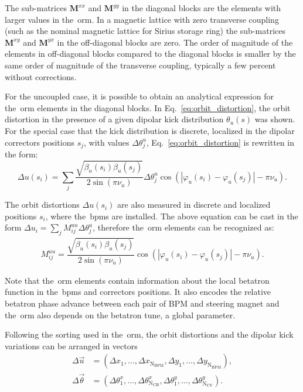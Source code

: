 The sub-matrices $\mathbf{M}^{xx}$ and $\mathbf{M}^{yy}$ in the diagonal blocks are the elements with larger values in the~\gls{orm}. In a magnetic lattice with zero transverse coupling (such as the nominal magnetic lattice for Sirius storage ring) the sub-matrices $\mathbf{M}^{xy}$ and $\mathbf{M}^{yx}$ in the off-diagonal blocks are zero. The order of magnitude of the elements in off-diagonal blocks compared to the diagonal blocks is smaller by the same order of magnitude of the transverse coupling, typically a few percent without corrections.

For the uncoupled case, it is possible to obtain an analytical expression for the~\gls{orm} elements in the diagonal blocks. In Eq.~\eqref{eq:orbit_distortion}, the orbit distortion in the presence of a given dipolar kick distribution $\theta_u(s)$ was shown. For the special case that the kick distribution is discrete, localized in the dipolar correctors positions $s_j$, with values $\Delta \theta^{u}_{j}$, Eq.~\eqref{eq:orbit_distortion} is rewritten in the form:
\begin{equation}
    \Delta u(s_i) = \sum_{j} \dfrac{\sqrt{\beta_{u}(s_i)\beta_{u}(s_j)}}{2\sin\left(\pi\nu_{u}\right)} \Delta \theta^{u}_j \cos\left( |\varphi_{u}(s_i) - \varphi_{u}(s_j)| - \pi\nu_{u} \right).
    \label{eq:discrete_orbit_distortion}
\end{equation}

The orbit distortions $\Delta u(s_i)$ are also measured in discrete and localized positions $s_i$, where the~\gls{bpm}s are installed. The above equation can be cast in the form $\Delta u_i = \sum_{j} M_{ij}^{uu} \Delta \theta_{j}^{u}$, therefore the~\gls{orm} elements can be recognized as:
\begin{align}
M_{ij}^{uu} = \dfrac{\sqrt{\beta_{u}(s_i)\beta_{u}(s_j)}}{2\sin\left(\pi\nu_{u}\right)}\cos\left( |\varphi_{u}(s_i) - \varphi_{u}(s_j)| - \pi\nu_{u} \right).
\label{eq:matrix_elements}
\end{align}

Note that the~\gls{orm} elements contain information about the local betatron function in the~\gls{bpm}s and correctors positions. It also encodes the relative betatron phase advance between each pair of BPM and steering magnet and the~\gls{orm} also depends on the betatron tune, a global parameter. 

Following the sorting used in the~\gls{orm}, the orbit distortions and the dipolar kick variations can be arranged in vectors
\begin{align*}
    \Delta \vec{u} &= \left(\Delta x_1, \ldots, \Delta x_{\mathrm{N}_{\mathrm{BPM}}}, \Delta y_1, \ldots, \Delta y_{\mathrm{N}_{\mathrm{BPM}}}\right), \\
    \Delta \vec{\theta} &= \left(\Delta \theta_1^x, \ldots, \Delta \theta_{\mathrm{N}_{\mathrm{CH}}}^x, \Delta \theta_1^y, \ldots, \Delta \theta_{\mathrm{N}_{\mathrm{CV}}}^y\right).
\end{align*}

